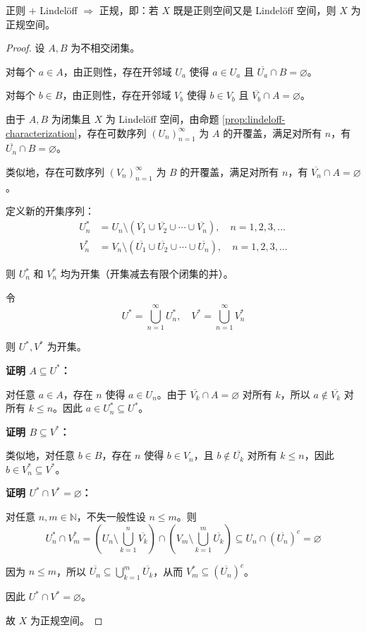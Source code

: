 \documentclass[lang=cn,a4paper,newtx,figureplace=section,tableplace=section]{elegantbook}
\begin{document}
\begin{proposition}\label{prop:regular-lindeloff-implies-normal}
正则 $+$ Lindelöff $\Rightarrow$ 正规，即：若 $X$ 既是正则空间又是 Lindelöff 空间，则 $X$ 为正规空间。
\end{proposition}
\begin{proof}
设 $A, B$ 为不相交闭集。

对每个 $a \in A$，由正则性，存在开邻域 $U_a$ 使得 $a \in U_a$ 且 $\overline{U_a} \cap B = \varnothing$。

对每个 $b \in B$，由正则性，存在开邻域 $V_b$ 使得 $b \in V_b$ 且 $\overline{V_b} \cap A = \varnothing$。

由于 $A, B$ 为闭集且 $X$ 为 Lindelöff 空间，由命题 \ref{prop:lindeloff-characterization}，存在可数序列 $(U_n)_{n=1}^{\infty}$ 为 $A$ 的开覆盖，满足对所有 $n$，有 $\overline{U_n} \cap B = \varnothing$。

类似地，存在可数序列 $(V_n)_{n=1}^{\infty}$ 为 $B$ 的开覆盖，满足对所有 $n$，有 $\overline{V_n} \cap A = \varnothing$。

定义新的开集序列：
\begin{align}
U_n^* &= U_n \setminus \left(\overline{V_1} \cup \overline{V_2} \cup \cdots \cup \overline{V_n}\right), \quad n = 1, 2, 3, \ldots \\
V_n^* &= V_n \setminus \left(\overline{U_1} \cup \overline{U_2} \cup \cdots \cup \overline{U_n}\right), \quad n = 1, 2, 3, \ldots
\end{align}

则 $U_n^*$ 和 $V_n^*$ 均为开集（开集减去有限个闭集的并）。

令
\begin{equation}
U^* = \bigcup_{n=1}^{\infty} U_n^*, \quad V^* = \bigcup_{n=1}^{\infty} V_n^*
\end{equation}

则 $U^*, V^*$ 为开集。

\textbf{证明 $A \subseteq U^*$：}

对任意 $a \in A$，存在 $n$ 使得 $a \in U_n$。由于 $\overline{V_k} \cap A = \varnothing$ 对所有 $k$，所以 $a \notin \overline{V_k}$ 对所有 $k \leq n$。因此 $a \in U_n^* \subseteq U^*$。

\textbf{证明 $B \subseteq V^*$：}

类似地，对任意 $b \in B$，存在 $n$ 使得 $b \in V_n$，且 $b \notin \overline{U_k}$ 对所有 $k \leq n$，因此 $b \in V_n^* \subseteq V^*$。

\textbf{证明 $U^* \cap V^* = \varnothing$：}

对任意 $n, m \in \mathbb{N}$，不失一般性设 $n \leq m$。则
\begin{equation}
U_n^* \cap V_m^* = \left(U_n \setminus \bigcup_{k=1}^{n} \overline{V_k}\right) \cap \left(V_m \setminus \bigcup_{k=1}^{m} \overline{U_k}\right) \subseteq U_n \cap (\overline{U_n})^c = \varnothing
\end{equation}

因为 $n \leq m$，所以 $\overline{U_n} \subseteq \bigcup_{k=1}^{m} \overline{U_k}$，从而 $V_m^* \subseteq (\overline{U_n})^c$。

因此 $U^* \cap V^* = \varnothing$。

故 $X$ 为正规空间。
\end{proof}
\end{document}
